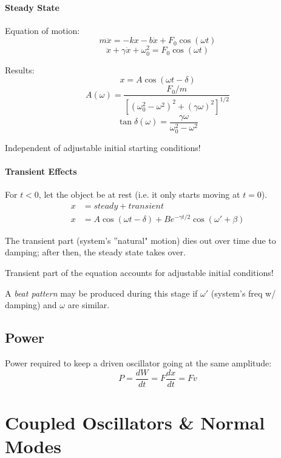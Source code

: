 \documentclass[11pt,letterpaper,titlepage,oneside]{book}
\begin{document}
\subsubsection{Steady State}

Equation of motion:
\[ m\ddot{x} = -kx - b\dot{x} + F_0 \cos(\omega t) \]
\[ \ddot{x} + \gamma\dot{x} + \omega_0^2 = F_0 \cos(\omega t) \]

Results: 
\[ x = A \cos (\omega t - \delta) \]
\[ A(\omega) = \frac{F_0/m}{[(\omega_0^2 - \omega^2)^2 + (\gamma\omega)^2]^{1/2}} \]
\[ \tan \delta (\omega) = \frac{\gamma\omega}{\omega_0^2 - \omega^2}\]

Independent of adjustable initial starting conditions!

\subsubsection{Transient Effects}
For $t<0$, let the object be at rest (i.e. it only starts moving at $t=0$).
\begin{align*}
x &= steady + transient \\
x &= A \cos (\omega t - \delta) + B e^{-\gamma t/2} \cos(\omega' + \beta)
\end{align*}

The transient part (system's ''natural" motion) dies out over time due to damping; after then, the steady state takes over. 

Transient part of the equation accounts for adjustable initial conditions!

A \emph{beat pattern} may be produced during this stage if $\omega'$ (system's freq w/ damping) and $\omega$ are similar.

\section{Power}
Power required to keep a driven oscillator going at the same amplitude:
\[ P = \frac{dW}{dt} = F\frac{dx}{dt} = Fv \]

\chapter{Coupled Oscillators \& Normal Modes}
\end{document}
